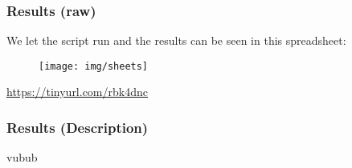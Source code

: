 \begin{frame} \frametitle{Results (raw)}

	We let the script run and the results can be seen in this spreadsheet:
	
	\begin{center}
		\begin{figure}[H]
			\texttt{[image: img/sheets]}
		\end{figure}
		{\color{red} \url{https://tinyurl.com/rbk4dnc}}
	\end{center}
	\vfill
	
	

\end{frame}

\begin{frame} \frametitle{Results (Description)}
	vubub
\end{frame}
